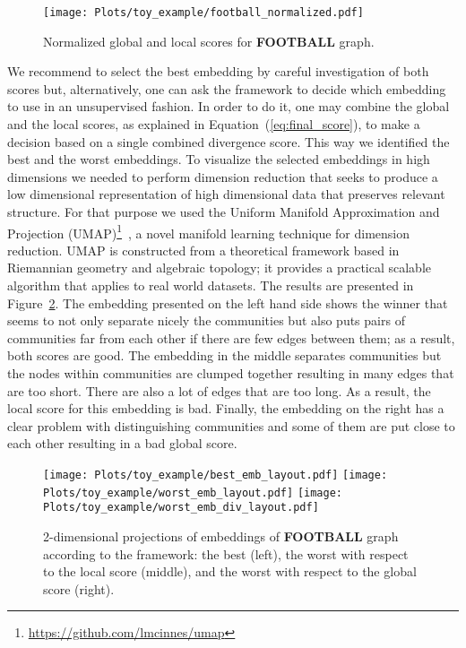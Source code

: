 \documentclass[11pt]{article}
\begin{document}
 \begin{figure}[ht]
     \centering
     \texttt{[image: Plots/toy\_example/football\_normalized.pdf]}
     \caption{Normalized global and local scores for \textbf{FOOTBALL} graph.}
     \label{fig_paper:toy_normalized}
 \end{figure}

We recommend to select the best embedding by careful investigation of both scores but, alternatively, one can ask the framework to decide which embedding to use in an unsupervised fashion. In order to do it, one may combine the global and the local scores, as explained in Equation~(\ref{eq:final_score}), to make a decision based on a single combined divergence score. This way we identified the best and the worst embeddings. To visualize the selected embeddings in high dimensions we needed to perform dimension reduction that seeks to produce a low dimensional representation of high dimensional data that preserves relevant structure. For that purpose we used the Uniform Manifold Approximation and Projection (UMAP)\footnote{\url{ https://github.com/lmcinnes/umap}}~\cite{mcinnes2018umap}, a novel manifold learning technique for dimension reduction. UMAP is constructed from a theoretical framework based in Riemannian geometry and algebraic topology; it provides a practical scalable algorithm that applies to real world datasets. The results are presented in Figure~\ref{fig_paper:toy_best_worst_layout}. The embedding presented on the left hand side shows the winner that seems to not only separate nicely the communities but also puts pairs of communities far from each other if there are few edges between them; as a result, both scores are good. The embedding in the middle separates communities but the nodes within communities are clumped together resulting in many edges that are too short. There are also a lot of edges that are too long. As a result, the local score for this embedding is bad. Finally, the embedding on the right has a clear problem with distinguishing communities and some of them are put close to each other resulting in a bad global score.

 \begin{figure}[ht]
     \centering
     \texttt{[image: Plots/toy\_example/best\_emb\_layout.pdf]}
         \hspace{.1cm}
     \texttt{[image: Plots/toy\_example/worst\_emb\_layout.pdf]}
     \texttt{[image: Plots/toy\_example/worst\_emb\_div\_layout.pdf]}
     \caption{2-dimensional projections of embeddings of \textbf{FOOTBALL} graph according to the framework: the best (left), the worst with respect to the local score (middle), and the worst with respect to the global score (right).}
     \label{fig_paper:toy_best_worst_layout}
 \end{figure}
 
\end{document}
